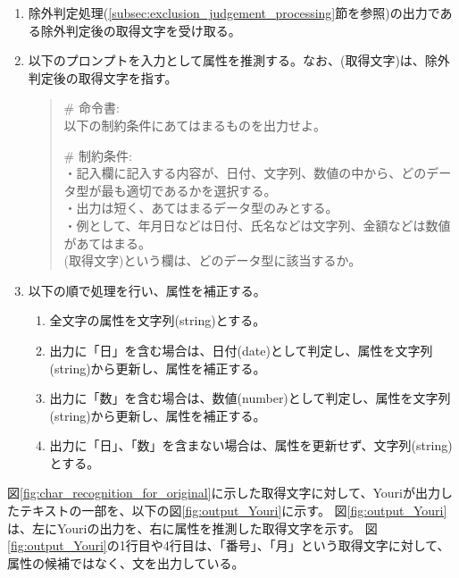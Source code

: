 \begin{enumerate}
    \item 除外判定処理(\ref{subsec:exclusion_judgement_processing}節を参照)の出力である除外判定後の取得文字を受け取る。
    \item 以下のプロンプトを入力として属性を推測する。なお、(取得文字)は、除外判定後の取得文字を指す。\\
    \begin{quotation}
        \# 命令書:\\
        以下の制約条件にあてはまるものを出力せよ。
        
        \# 制約条件:\\
        ・記入欄に記入する内容が、日付、文字列、数値の中から、どのデータ型が最も適切であるかを選択する。\\
        ・出力は短く、あてはまるデータ型のみとする。\\
        ・例として、年月日などは日付、氏名などは文字列、金額などは数値があてはまる。\\
        
        (取得文字)という欄は、どのデータ型に該当するか。
    \end{quotation}
    \item 以下の順で処理を行い、属性を補正する。
        \begin{enumerate}
            \item 全文字の属性を文字列(string)とする。
            \item 出力に「日」を含む場合は、日付(date)として判定し、属性を文字列(string)から更新し、属性を補正する。
            \item 出力に「数」を含む場合は、数値(number)として判定し、属性を文字列(string)から更新し、属性を補正する。
            \item 出力に「日」、「数」を含まない場合は、属性を更新せず、文字列(string)とする。
        \end{enumerate}
\end{enumerate}

図\ref{fig:char_recognition_for_original}に示した取得文字に対して、Youriが出力したテキストの一部を、以下の図\ref{fig:output_Youri}に示す。
図\ref{fig:output_Youri}は、左にYouriの出力を、右に属性を推測した取得文字を示す。
図\ref{fig:output_Youri}の1行目や4行目は、「番号」、「月」という取得文字に対して、属性の候補ではなく、文を出力している。


